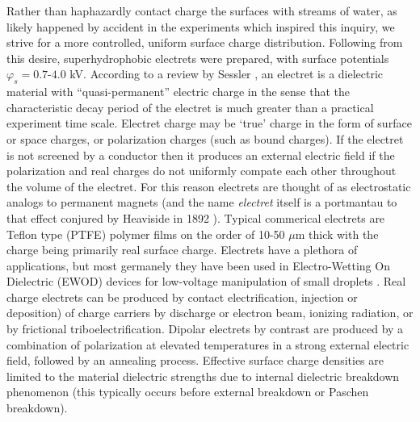 \documentclass[12pt,a4paper,oneside]{book}
\begin{document}
Rather than haphazardly contact charge the surfaces with streams of water, as likely happened by accident in the experiments which inspired this inquiry, we strive for a more controlled, uniform surface charge distribution. Following from this desire, superhydrophobic electrets were prepared, with surface potentials $\varphi_s = 0.7$-$4.0$ kV. According to a review by Sessler \cite{_electrets_????}, an electret is a dielectric material with ``quasi-permanent'' electric charge in the sense that the characteristic decay period of the electret is much greater than a practical experiment time scale. Electret charge may be `true' charge in the form of surface or space charges, or polarization charges (such as bound charges). If the electret is not screened by a conductor then it produces an external electric field if the polarization and real charges do not uniformly compate each other throughout the volume of the electret. For this reason electrets are thought of as electrostatic analogs to permanent magnets (and the name \emph{electret} itself is a portmantau to that effect conjured by Heaviside in 1892 \cite{heaviside_electrical_2011}). Typical commerical electrets are Teflon type (PTFE) polymer films on the order of 10-50 $\mu$m thick with the charge being primarily real surface charge. Electrets have a plethora of applications, but most germanely they have been used in Electro-Wetting On Dielectric (EWOD) devices for low-voltage manipulation of small droplets \cite{wu_low-voltage_2010}. Real charge electrets can be produced by contact electrification, injection or deposition) of charge carriers by discharge or electron beam, ionizing radiation, or by frictional triboelectrification. Dipolar electrets by contrast are produced by a combination of polarization at elevated temperatures in a strong external electric field, followed by an annealing process. Effective surface charge densities are limited to the material dielectric strengths due to internal dielectric breakdown phenomenon (this typically occurs before external breakdown or Paschen breakdown). 
\end{document}
